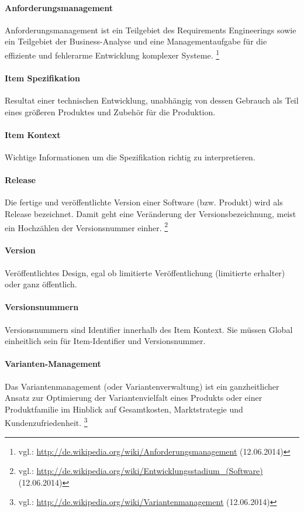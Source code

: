 \paragraph{Anforderungsmanagement}
Anforderungsmanagement ist ein Teilgebiet des Requirements Engineerings sowie ein Teilgebiet der Business-Analyse und eine Managementaufgabe für die effiziente und fehlerarme Entwicklung komplexer Systeme. \footnote{vgl.: \url{http://de.wikipedia.org/wiki/Anforderungsmanagement} (12.06.2014)}

\paragraph{Item Spezifikation}
Resultat einer technischen Entwicklung, unabhängig von dessen Gebrauch als Teil eines größeren Produktes und Zubehör für die Produktion.

\paragraph{Item Kontext}
Wichtige Informationen um die Spezifikation richtig zu interpretieren.

\paragraph{Release}
Die fertige und veröffentlichte Version einer Software (bzw. Produkt) wird als Release bezeichnet. Damit geht eine Veränderung der Versionsbezeichnung, meist ein Hochzählen der Versionsnummer einher. \footnote{vgl.: \url{http://de.wikipedia.org/wiki/Entwicklungsstadium_(Software)} (12.06.2014)}

\paragraph{Version}
Veröffentlichtes Design, egal ob limitierte Veröffentlichung (limitierte erhalter) oder ganz öffentlich.

\paragraph{Versionsnummern}
Versionsnummern sind Identifier innerhalb des Item Kontext. Sie müssen Global einheitlich sein für Item-Identifier und Versionsnummer.

\paragraph{Varianten-Management}
Das Variantenmanagement (oder Variantenverwaltung) ist ein ganzheitlicher Ansatz zur Optimierung der Variantenvielfalt eines Produkts oder einer Produktfamilie im Hinblick auf Gesamtkosten, Marktstrategie und Kundenzufriedenheit. \footnote{vgl.: \url{http://de.wikipedia.org/wiki/Variantenmanagement} (12.06.2014)}

